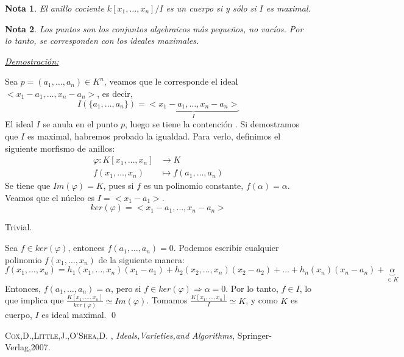 \documentclass{article}
\newtheorem{nota}{Nota}
\begin{document}
\begin{nota}
El anillo cociente $k[x_1,\dots,x_n]/I$ es un cuerpo si y sólo si $I$ es maximal. 
\end{nota}
\begin{nota}
Los puntos son los conjuntos algebraicos más pequeños, no vacíos. Por lo tanto, se corresponden con los ideales maximales. 
\end{nota}


\underline{\textit{Demostración:}}

\vspace{3mm}

Sea $p=(a_1,\dots,a_n)\in K^n$, veamos que le corresponde el ideal $<x_1-a_1,\dots,x_n-a_n>$, es decir,
$$ I(\{a_1,\dots,a_n\})=\underbrace{<x_1-a_1,\dots,x_n-a_n>}_I$$
El ideal $I$ se anula en el punto $p$, luego se tiene la contención \framebox{$\supseteq $}. Si demostramos que $I$ es maximal, habremos probado la igualdad. Para verlo, definimos el siguiente morfismo de anillos:
\begin{equation}
  \begin{split}
    \varphi: K[x_1,\dots,x_n] &\rightarrow K  \\
    f(x_1,\dots,x_n) & \mapsto f(a_1,\dots,a_n)
  \end{split}
\end{equation}
Se tiene que $Im(\varphi)=K$, pues si $f$ es un polinomio constante, $f(\alpha)=\alpha$. Veamos que el núcleo es $I=<x_1-a_1>$. 
$$ker(\varphi) = <x_1-a_1,\dots,x_n-a_n> $$

\framebox{$\supseteq $} Trivial.

\framebox{$\subseteq $} Sea $f\in ker(\varphi)$, entonces $f(a_1,\dots,a_n)=0$. Podemos escribir cualquier polinomio $f(x_1,\dots,x_n)$ de la siguiente manera:
$$f(x_1,\dots,x_n)=h_1(x_1,\dots,x_n)(x_1-a_1)+h_2(x_2,\dots,x_n)(x_2-a_2)+\dots +h_n(x_n)(x_n-a_n)+\underbrace{\alpha}_{\in K}$$
Entonces, $f(a_1,\dots,a_n)=\alpha$, pero si $f\in ker(\varphi) \Rightarrow \alpha=0$. Por lo tanto, $f\in I$, lo que implica que $\frac{K[x_1,\dots,x_n]}{ker(\varphi)} \simeq Im(\varphi)$.
Tomamos $\frac{K[x_1,\dots,x_n]}{I} \simeq K$, y como $K$ es cuerpo, $I$ es ideal maximal. \qed



\begin{thebibliography}{X}
 \textsc{Cox,D.,Little,J.,O'Shea,D.} ,
\textit{Ideals,Varieties,and Algorithms}, Springer-Verlag,2007.
\end{thebibliography}
\end{document}
